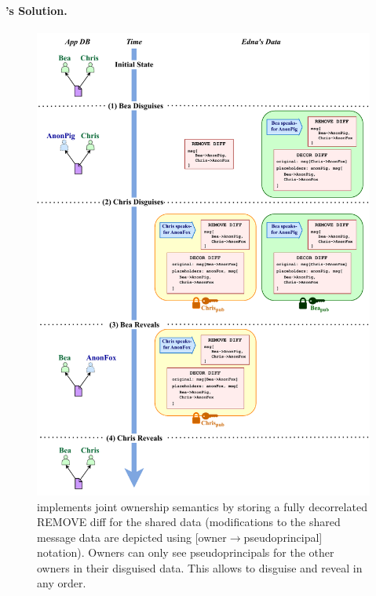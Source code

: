 %
\paragraph{\sys's Solution.}

\begin{figure}
    \centering
    \includegraphics[width=\textwidth]{figs/shared_data}
  \caption{\sys implements joint ownership semantics by storing a fully
    decorrelated REMOVE diff for the shared data (modifications to the shared
    message data are depicted using 
    [owner$\to$pseudoprincipal] notation). Owners can only see
    pseudoprincipals for the other owners in their disguised data. This allows
    \sys to disguise and reveal in any order.}
\label{f:shared:data}
\end{figure}

